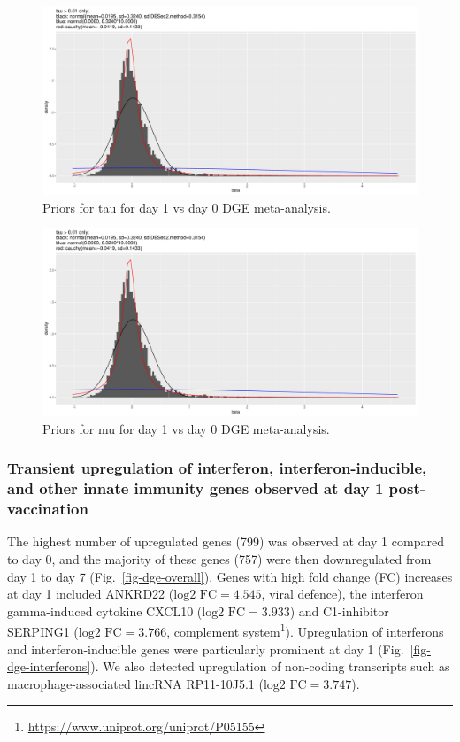 \begin{figure}
    \includegraphics[width=1.0\textwidth,page=2]{mainmatter/figures/chapter_02/meta.bayesmeta.priors.coefName_d1.vs.d0.pdf}
    \caption{Priors for tau for day 1 vs day 0 DGE meta-analysis.}
    \label{fig:hird_dgeMeta_priors_tau}
\end{figure}

\begin{figure}
    \includegraphics[width=1.0\textwidth,page=2]{mainmatter/figures/chapter_02/meta.bayesmeta.priors.coefName_d1.vs.d0.pdf}
    \caption{Priors for mu for day 1 vs day 0 DGE meta-analysis.}
    \label{fig:hird_dgeMeta_priors_mu}
\end{figure}

\subsubsection{Transient upregulation of interferon, interferon-inducible, and other innate immunity genes observed at day 1 post-vaccination}

The highest number of upregulated genes (799) was observed at day 1 compared to day 0, and the majority of these genes (757) were then downregulated from day 1 to day 7 (Fig.~\ref{fig-dge-overall}).
Genes with high fold change (FC) increases at day 1 included ANKRD22 ($\text{log2 FC} = 4.545$, viral defence\autocite{Bin2016}), the interferon gamma-induced cytokine CXCL10 ($\text{log2 FC} = 3.933$) and C1-inhibitor SERPING1 ($\text{log2 FC} = 3.766$, complement system\footnote{\url{https://www.uniprot.org/uniprot/P05155}}).
Upregulation of interferons and interferon-inducible genes were particularly prominent at day 1 (Fig.~\ref{fig-dge-interferons}).
We also detected upregulation of non-coding transcripts such as macrophage-associated\autocite{Zhang2017b} lincRNA RP11-10J5.1 ($\text{log2 FC} = 3.747$).


